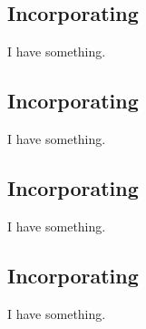 \subsection{Incorporating} \label{aa}

I have something.

\subsection{Incorporating}

I have something.

\subsection{Incorporating } \label{aa}

I have something.

\subsection{Incorporating }

I have something.
